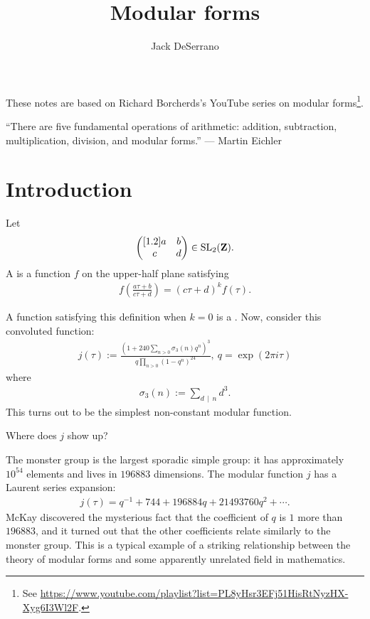 \documentclass[11pt, oneside,margin=1in]{article}
\title{Modular forms}
\author{Jack DeSerrano}
\begin{document}
\ifams
    \vspace*{\fill}
\fi
\maketitle
These notes are based on Richard Borcherds's YouTube series on modular forms\footnote{See \url{https://www.youtube.com/playlist?list=PL8yHsr3EFj51HisRtNyzHX-Xyg6I3Wl2F}.}.
\ifams
	\vspace*{\fill}
\fi
\vfill
\begin{center}
	``There are five fundamental operations of arithmetic: addition, subtraction, multiplication, division, and modular forms.'' --- Martin Eichler
\end{center}
{\vfill}
\newpage
\section{Introduction}
\begin{definition}\label{}\text{}
Let 
\begin{align*}
	\begin{pmatrix} [ 1.2 ] a&b\\c&d\end{pmatrix} \in \operatorname{SL}_{2}(\mathbf Z).
\end{align*}
A  is a function $f$ on the upper-half plane satisfying
\begin{align*}
	f\left( \frac{a\tau + b}{c\tau + d} \right) = (c\tau + d) ^k f(\tau).
\end{align*}
\end{definition}
\begin{example}\label{}\text{}
A function satisfying this definition when $k=0$ is a . Now, consider this convoluted function:
\begin{align*}
	j(\tau) :=  \frac{\left(1 + 240 \sum_{n>0}^{} \sigma_3(n)q^n \right)^3}{q \prod_{n>0} (1-q^n)^{24}},\ q= \exp(2\pi i \tau)
\end{align*}
where
\begin{align*}
	\sigma_3(n) :=  \sum_{d\, \mid\,  n}^{} d^3.
\end{align*}
This turns out to be the simplest non-constant modular function.
\end{example}

Where does $j$ show up?

\begin{example}\label{}\text{}
The monster group is the largest sporadic simple group: it has approximately $10^{54}$ elements and lives in $196883$ dimensions. The modular function $j$ has a Laurent series expansion:
\begin{align*}
	j(\tau) = q ^{-1} + 744 + 196884q + 21493760q^2 + \cdots.
\end{align*}
McKay discovered the mysterious fact that the coefficient of $q$ is $1$ more than $196883$, and it turned out that the other coefficients relate similarly to the monster group. This is a typical example of a striking relationship between the theory of modular forms and some apparently unrelated field in mathematics. 
\end{example}
\end{document}

